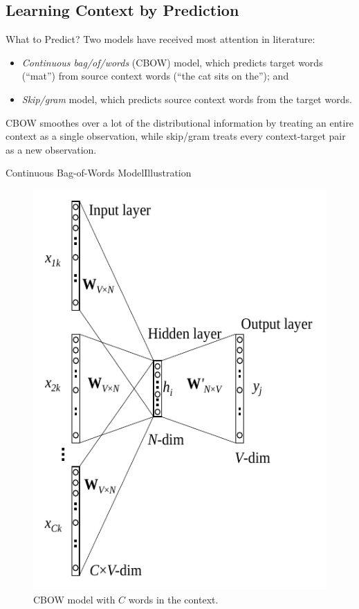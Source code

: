 \documentclass[usepdftitle=false]{beamer}
\theoremstyle{definition}
\begin{document}
\subsection{Learning Context by Prediction}

\begin{frame}{What to Predict?}
  Two models have received most attention in literature:
  \begin{itemize}
  \item \emph{Continuous bag\-/of\-/words} (CBOW) model, which
    predicts target words (\enquote{mat}) from source context words
    (\enquote{the cat sits on the}); and
  \item \emph{Skip\-/gram} model, which predicts source context words
    from the target words.
  \end{itemize}
  CBOW smoothes over a lot of the distributional information by
  treating an entire context as a single observation, while
  skip\-/gram treats every context\--target pair as a new observation.
\end{frame}

\begin{frame}{Continuous Bag-of-Words Model}{Illustration}
  \begin{figure}
    \centering%
    \includegraphics[width=.4\textwidth]{CBOW.pdf}%
    \caption{CBOW model with \(C\) words in the context.}
  \end{figure}
\end{frame}
\end{document}
